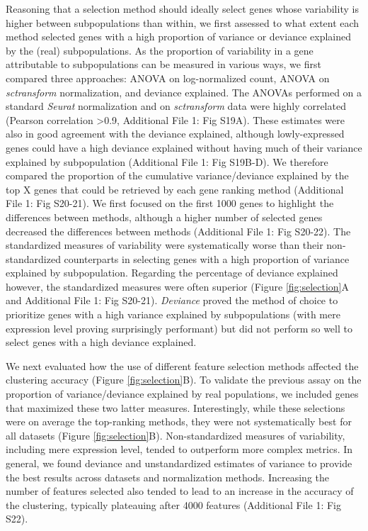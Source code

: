 \documentclass{bmcart}
\begin{document}
Reasoning that a selection method should ideally select genes whose variability is higher between subpopulations than within, we first assessed to what extent each method selected genes with a high proportion of variance or deviance explained by the (real) subpopulations. As the proportion of variability in a gene attributable to subpopulations can be measured in various ways, we first compared three approaches: ANOVA on log-normalized count, ANOVA on \textit{sctransform} normalization, and deviance explained. The ANOVAs performed on a standard \textit{Seurat} normalization and on \textit{sctransform} data were highly correlated (Pearson correlation >0.9, Additional File 1: Fig S19A). These estimates were also in good agreement with the deviance explained, although lowly-expressed genes could have a high deviance explained without having much of their variance explained by subpopulation (Additional File 1: Fig S19B-D). We therefore compared the proportion of the cumulative variance/deviance explained by the top X genes that could be retrieved by each gene ranking method (Additional File 1: Fig S20-21). We first focused on the first 1000 genes to highlight the differences between methods, although a higher number of selected genes decreased the differences between methods (Additional File 1: Fig S20-22). The standardized measures of variability were systematically worse than their non-standardized counterparts in selecting genes with a high proportion of variance explained by subpopulation. Regarding the percentage of deviance explained however, the standardized measures were often superior (Figure \ref{fig:selection}A and Additional File 1: Fig S20-21). \textit{Deviance} proved the method of choice to prioritize genes with a high variance explained by subpopulations (with mere expression level proving surprisingly performant) but did not perform so well to select genes with a high deviance explained.

We next evaluated how the use of different feature selection methods affected the clustering accuracy (Figure \ref{fig:selection}B). To validate the previous assay on the proportion of variance/deviance explained by real populations, we included genes that maximized these two latter measures. Interestingly, while these selections were on average the top-ranking methods, they were not systematically best for all datasets (Figure \ref{fig:selection}B). Non-standardized measures of variability, including mere expression level, tended to outperform more complex metrics. In general, we found deviance and unstandardized estimates of variance to provide the best results across datasets and normalization methods. Increasing the number of features selected also tended to lead to an increase in the accuracy of the clustering, typically plateauing after 4000 features (Additional File 1: Fig S22).
\end{document}
